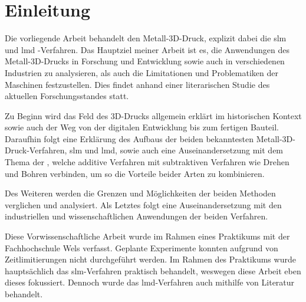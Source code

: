 \documentclass[../main.tex]{subfiles}
\begin{document}
\section{Einleitung}
Die vorliegende Arbeit behandelt den Metall-3D-Druck, explizit dabei die \acrlong{slm} und \acrlong{lmd}
-Verfahren. Das Hauptziel meiner Arbeit ist es, die Anwendungen des Metall-3D-Drucks in Forschung und Entwicklung sowie auch in verschiedenen Industrien zu analysieren, als auch die Limitationen und Problematiken der Maschinen festzustellen. Dies findet anhand einer literarischen Studie des aktuellen Forschungsstandes statt. 

Zu Beginn wird das Feld des 3D-Drucks allgemein erklärt im historischen Kontext sowie auch der Weg von der digitalen Entwicklung bis zum fertigen Bauteil. Daraufhin folgt eine Erklärung des Aufbaus der beiden bekanntesten Metall-3D-Druck-Verfahren, \acrshort{slm} und \acrshort{lmd}, sowie auch eine Auseinandersetzung mit dem Thema der , welche additive Verfahren mit subtraktiven Verfahren wie Drehen und Bohren verbinden, um so die Vorteile beider Arten zu kombinieren. 

Des Weiteren werden die Grenzen und Möglichkeiten der beiden Methoden verglichen und analysiert. Als Letztes folgt eine Auseinandersetzung mit den industriellen und wissenschaftlichen Anwendungen der beiden Verfahren.

Diese Vorwissenschaftliche Arbeit wurde im Rahmen eines Praktikums mit der Fachhochschule Wels verfasst. Geplante Experimente konnten aufgrund von Zeitlimitierungen nicht durchgeführt werden. Im Rahmen des Praktikums wurde hauptsächlich das \acrshort{slm}-Verfahren praktisch behandelt, weswegen diese Arbeit eben dieses fokussiert. Dennoch wurde das \acrshort{lmd}-Verfahren auch mithilfe von Literatur behandelt. 
\end{document}
